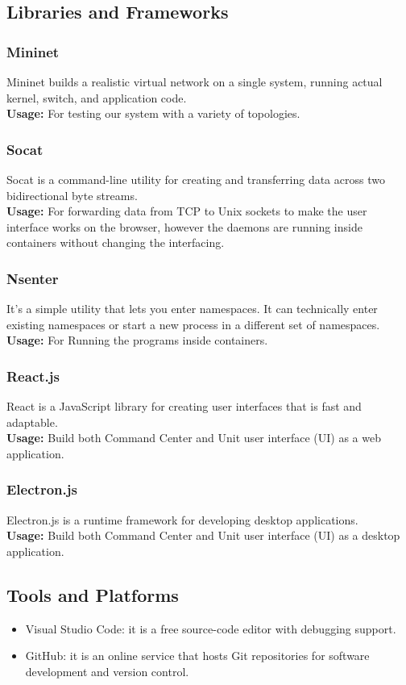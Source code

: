 \subsection{Libraries and Frameworks}
\subsubsection{Mininet}
Mininet builds a realistic virtual network on a single system, running actual kernel, switch, and application code.
\\
\textbf{Usage:} For testing our system with a variety of topologies.
\subsubsection{Socat}
Socat is a command-line utility for creating and transferring data across two bidirectional byte streams.
\\
\textbf{Usage:} For forwarding data from TCP to Unix sockets to make the user interface works on the browser, however the daemons are running inside containers without changing the interfacing.
\subsubsection{Nsenter}
It's a simple utility that lets you enter namespaces.
It can technically enter existing namespaces or start a new process in a different set of namespaces. 
\\
\textbf{Usage:} For Running the programs inside containers.
\subsubsection{React.js}
React is a JavaScript library for creating user interfaces that is fast and adaptable.
\\
\textbf{Usage:} Build both Command Center and Unit user interface (UI) as a web application.
\subsubsection{Electron.js}
Electron.js is a runtime framework for developing desktop applications.
\\
\textbf{Usage:} Build both Command Center and Unit user interface (UI) as a desktop application.
\subsection{Tools and Platforms}
\begin{itemize}
    \item Visual Studio Code: it is a free source-code editor with debugging support.
    \item GitHub: it is an online service that hosts Git repositories for software development and version control. 
\end{itemize}
